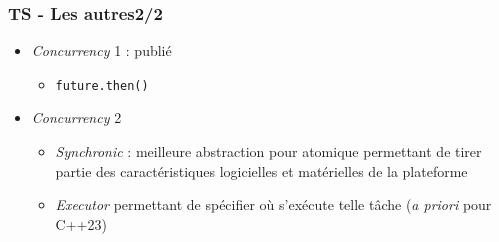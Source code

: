 \documentclass[C++.tex]{subfiles}
\begin{document}
\begin{frame}
	\frametitle{TS - Les autres\titlehfill{}2/2}
	\begin{itemize}
		\item \textit{Concurrency} 1 : publié
		\begin{itemize}
			\item \lstinline|future.then()|
		\end{itemize}
		\item \textit{Concurrency} 2
		\begin{itemize}
			\item \textit{Synchronic} : meilleure abstraction pour atomique permettant de tirer partie des caractéristiques logicielles et matérielles de la plateforme
			\item \textit{Executor} permettant de spécifier où s'exécute telle tâche (\textit{a priori} pour C++23)
		\end{itemize}
	\end{itemize}
\end{frame}
\end{document}
